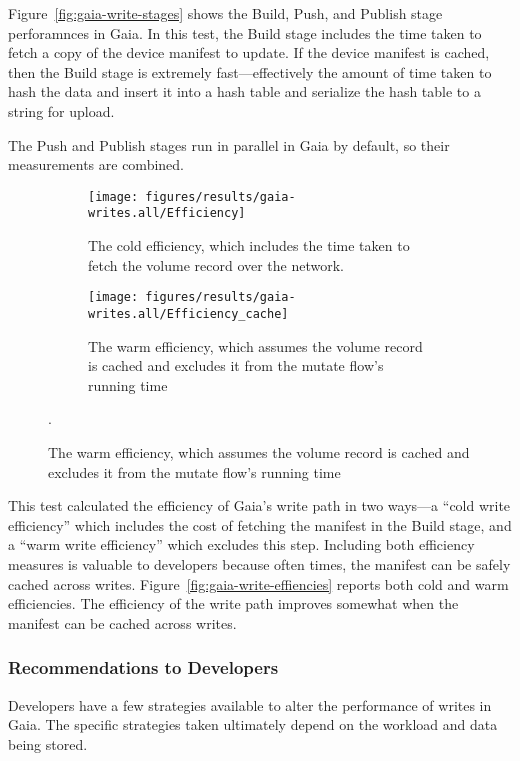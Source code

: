Figure~\ref{fig:gaia-write-stages} shows the Build, Push, and Publish stage
perforamnces in Gaia.  In this test, the Build stage includes
the time taken to fetch a copy of the device manifest to update.  If the device
manifest is cached, then the Build stage is extremely fast---effectively the amount of
time taken to hash the data and insert it into a hash table and serialize the
hash table to a string for upload.

The Push and Publish stages run in parallel in Gaia by default, so their
measurements are combined.

\begin{figure}[htp!]
   \centering
   \caption{Box-and-wiskers plots of Gaia's write efficiencies.}
   \begin{subfigure}[b]{.8\textwidth}
      \texttt{[image: figures/results/gaia-writes.all/Efficiency]}
      \label{fig:gaia-read-getmanifest}
      \caption{The cold efficiency, which includes the time taken to fetch the
      volume record over the network.}
   \end{subfigure}
   \begin{subfigure}[b]{.8\textwidth}
      \texttt{[image: figures/results/gaia-writes.all/Efficiency\_cache]}
      \label{fig:gaia-read-discover}
      \caption{The warm efficiency, which assumes the volume record is cached
      and excludes it from the mutate flow's running time}
   \end{subfigure}
   \label{fig:gaia-write-efficiencies}.
\end{figure}

This test calculated the efficiency of Gaia's write path in two ways---a ``cold
write efficiency'' which includes the cost of fetching the manifest in the Build
stage, and a ``warm write efficiency'' which excludes this step.  Including both
efficiency measures is valuable to developers because often times, the manifest
can be safely cached across writes.  Figure~\ref{fig:gaia-write-effiencies}
reports both cold and warm efficiencies.  The efficiency of the write path
improves somewhat when the manifest can be cached across writes.

\subsubsection{Recommendations to Developers}

Developers have a few strategies available to alter the performance of writes in Gaia.
The specific strategies taken ultimately depend on the workload and data being
stored.

